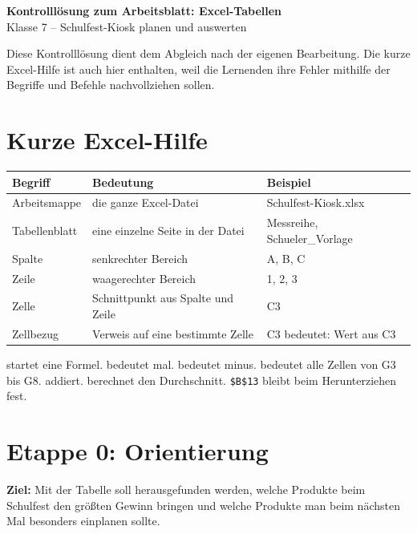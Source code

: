 
\begin{center}
{\LARGE\bfseries Kontrolllösung zum Arbeitsblatt: Excel-Tabellen}\\[1mm]
{\large Klasse 7 -- Schulfest-Kiosk planen und auswerten}
\end{center}

\begin{boxK}
Diese Kontrolllösung dient dem Abgleich nach der eigenen Bearbeitung. Die kurze Excel-Hilfe ist auch hier enthalten, weil die Lernenden ihre Fehler mithilfe der Begriffe und Befehle nachvollziehen sollen.
\end{boxK}

\section*{Kurze Excel-Hilfe}
\begin{tabularx}{\textwidth}{|L{3.0cm}|Y|L{3.0cm}|}
\hline
{}\textbf{Begriff} & \textbf{Bedeutung} & \textbf{Beispiel}\\\hline
Arbeitsmappe & die ganze Excel-Datei & Schulfest-Kiosk.xlsx\\\hline
Tabellenblatt & eine einzelne Seite in der Datei & Messreihe, Schueler\_Vorlage\\\hline
Spalte & senkrechter Bereich & A, B, C\\\hline
Zeile & waagerechter Bereich & 1, 2, 3\\\hline
Zelle & Schnittpunkt aus Spalte und Zeile & C3\\\hline
Zellbezug & Verweis auf eine bestimmte Zelle & C3 bedeutet: Wert aus C3\\\hline
\end{tabularx}

\begin{boxHinweis}
\code{=} startet eine Formel. \code{*} bedeutet mal. \code{-} bedeutet minus.  bedeutet alle Zellen von G3 bis G8.  addiert.  berechnet den Durchschnitt. \texttt{\$B\$13} bleibt beim Herunterziehen fest.
\end{boxHinweis}

\section*{Etappe 0: Orientierung}
\textbf{Ziel:} Mit der Tabelle soll herausgefunden werden, welche Produkte beim Schulfest den größten Gewinn bringen und welche Produkte man beim nächsten Mal besonders einplanen sollte.

